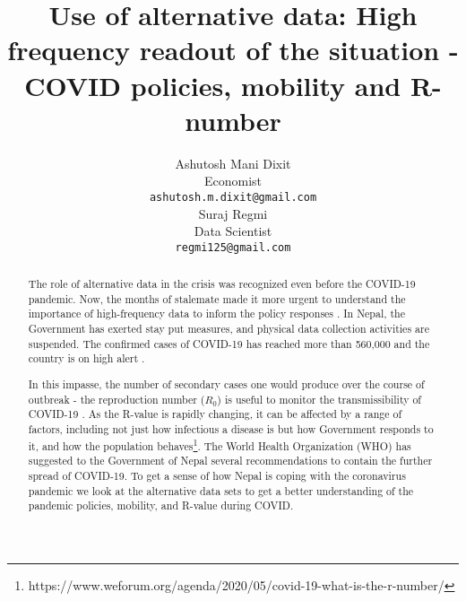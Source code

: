 \documentclass{article}
\title{Use of alternative data: 
High frequency readout of the situation - COVID policies, mobility and R-number
}
\author{
  Ashutosh Mani Dixit \\
  Economist\\
  \texttt{ashutosh.m.dixit@gmail.com} \\
   \And
  Suraj Regmi \\
  Data Scientist \\
  \texttt{regmi125@gmail.com} \\
}
\begin{document}
\maketitle

\begin{abstract}

The role of alternative data in the crisis was recognized even before the COVID-19 pandemic\cite{Hammer_etal_2017}. Now, the months of stalemate made it more urgent to understand the importance of high-frequency data to inform the policy responses \cite{ducharme_james_zhan_2020}. In Nepal, the Government has exerted stay put measures, and physical data collection activities are suspended. The confirmed cases of COVID-19 has reached more than 560,000\cite{mohp} and the country is on high alert .

In this impasse,  the number of secondary cases one would produce over the course of outbreak - the reproduction number ($R_0$) is useful to monitor the transmissibility of COVID-19 \cite{Wallinga_Teunis_2004}. As the R-value is rapidly changing, it can be affected by a range of factors, including not just how infectious a disease is but how Government responds to it, and how the population behaves\footnote{https://www.weforum.org/agenda/2020/05/covid-19-what-is-the-r-number/}. The World Health Organization (WHO) has suggested to the Government of Nepal several recommendations to contain the further spread of COVID-19. To get a sense of how Nepal is coping with the coronavirus pandemic we look at the alternative data sets to get a better understanding of the pandemic policies, mobility, and R-value during COVID.

\end{abstract}


\end{document}
